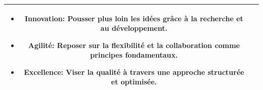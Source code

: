 \begin{table}[H]
\begin{tabular}{|c|c|}
\begin{minipage}{.48\textwidth}
\begin{justify}
\begin{itemize}[label=$\bullet$,left=-0.1cm]
                        \item \textbf{Innovation}: Pousser plus loin les idées grâce à la recherche et au développement.
                        \item \textbf{Agilité}: Reposer sur la flexibilité et la collaboration comme principes fondamentaux.
                        \item \textbf{Excellence}: Viser la qualité à travers une approche structurée et optimisée.
                    \end{itemize}
                \end{justify}
                \vspace{0.15cm}
            \end{minipage} \\\hline
        \end{tabular}
        \label{tab:objectifs}
    \end{table}
    \vspace{-0.6cm}
